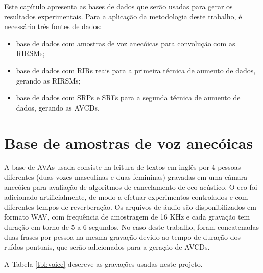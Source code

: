 Este capítulo apresenta as bases de dados que serão usadas para gerar os resultados experimentais.
Para a aplicação da metodologia deste trabalho, é necessário três fontes de dados:

\begin{itemize}
    \item base de dados com amostras de voz anecóicas para convolução com as RIRSMs;
    \item base de dados com RIRs reais para a primeira técnica de aumento de dados, gerando as RIRSMs;
    \item base de dados com SRPs e SRFs para a segunda técnica de aumento de dados, gerando as AVCDs.
\end{itemize}


\section{Base de amostras de voz anecóicas}

A base de AVAs usada consiste na leitura de textos em inglês por 4 pessoas diferentes (duas vozes masculinas e duas femininas)
gravadas em uma câmara anecóica para avaliação de algoritmos de cancelamento de eco acústico. 
O eco foi adicionado artificialmente, de modo a efetuar experimentos controlados e com diferentes tempos de reverberação.
Os arquivos de áudio são disponibilizados em formato WAV, com frequência de amostragem de 16 KHz e cada gravação tem duração
em torno de 5 a 6 segundos. No caso deste trabalho, foram concatenadas duas frases por pessoa na mesma 
gravação devido ao tempo de duração dos ruídos pontuais, que serão adicionados para a geração de AVCDs.

A Tabela \ref{tbl:voice} descreve as gravações usadas neste projeto.

